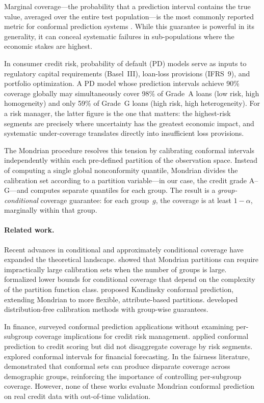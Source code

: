\documentclass[pmlr]{jmlr}
\begin{document}
Marginal coverage---the probability that a prediction interval contains the
true value, averaged over the entire test population---is the most commonly
reported metric for conformal prediction systems
\citep{vovk2005,papadopoulos2002}.  While this guarantee is powerful in its
generality, it can conceal systematic failures in sub-populations where the
economic stakes are highest.

In consumer credit risk, probability of default (PD) models serve as inputs to
regulatory capital requirements (Basel~III), loan-loss provisions (IFRS~9), and
portfolio optimization.  A PD model whose prediction intervals achieve 90\%
coverage globally may simultaneously cover 98\% of Grade~A loans (low risk,
high homogeneity) and only 59\% of Grade~G loans (high risk, high
heterogeneity).  For a risk manager, the latter figure is the one that
matters: the highest-risk segments are precisely where uncertainty has the
greatest economic impact, and systematic under-coverage translates directly
into insufficient loss provisions.

The Mondrian procedure \citep{vovk2005,bostrom2021} resolves this tension by
calibrating conformal intervals independently within each pre-defined
partition of the observation space.  Instead of computing a single global
nonconformity quantile, Mondrian divides the calibration set according to a
partition variable---in our case, the credit grade A--G---and computes separate
quantiles for each group.  The result is a \emph{group-conditional} coverage
guarantee: for each group~$g$, the coverage is at least $1-\alpha$,
marginally within that group.

\paragraph{Related work.}
Recent advances in conditional and approximately conditional coverage have
expanded the theoretical landscape.  \citet{ding2023} showed that Mondrian
partitions can require impractically large calibration sets when the number of
groups is large.  \citet{gibbs2024} formalized lower bounds for conditional
coverage that depend on the complexity of the partition function class.
\citet{bairaktari2025} proposed Kandinsky conformal prediction, extending
Mondrian to more flexible, attribute-based partitions.  \citet{plassier2024}
developed distribution-free calibration methods with group-wise guarantees.

In finance, \citet{noguer2024survey} surveyed conformal prediction
applications without examining per-subgroup coverage implications for credit
risk management.  \citet{fantazzini2024} applied conformal prediction to
credit scoring but did not disaggregate coverage by risk segments.
\citet{kato2025} explored conformal intervals for financial forecasting.  In
the fairness literature, \citet{cpfairness2025} demonstrated that conformal
sets can produce disparate coverage across demographic groups, reinforcing the
importance of controlling per-subgroup coverage.  However, none of these works
evaluate Mondrian conformal prediction on real credit data with out-of-time
validation.
\end{document}
